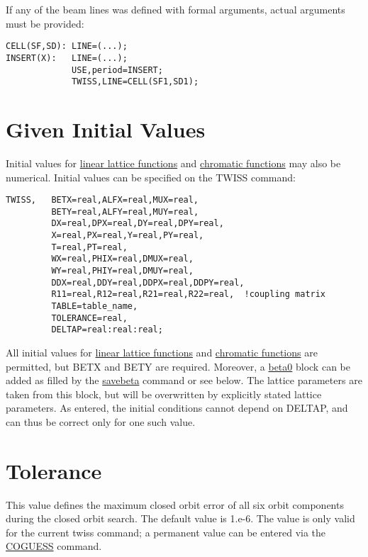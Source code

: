 If any of the beam lines was defined with formal arguments, actual
arguments must be provided:  
\begin{verbatim}
CELL(SF,SD): LINE=(...);
INSERT(X):   LINE=(...);
             USE,period=INSERT;
             TWISS,LINE=CELL(SF1,SD1);
\end{verbatim}

\section{Given Initial Values}

Initial values for \href{../Introduction/tables.html#linear}{linear
  lattice functions} and
\href{../Introduction/tables.html#chrom}{chromatic functions} may also
be numerical. Initial values can be specified on the TWISS command:  
\begin{verbatim}
TWISS,   BETX=real,ALFX=real,MUX=real,
         BETY=real,ALFY=real,MUY=real,
         DX=real,DPX=real,DY=real,DPY=real,
         X=real,PX=real,Y=real,PY=real,
         T=real,PT=real,
         WX=real,PHIX=real,DMUX=real,
         WY=real,PHIY=real,DMUY=real,
         DDX=real,DDY=real,DDPX=real,DDPY=real,
         R11=real,R12=real,R21=real,R22=real,  !coupling matrix
         TABLE=table_name,
         TOLERANCE=real,
         DELTAP=real:real:real;
\end{verbatim}

All initial values for \href{../Introduction/tables.html#linear}{linear
  lattice functions} and
\href{../Introduction/tables.html#chrom}{chromatic functions} are
permitted, but BETX and BETY are required. Moreover, a
\href{beta0}{beta0} block can be added as filled by the
\href{../control/general.html#savebeta}{savebeta} command or see
below. The lattice parameters are taken from this block, but will be
overwritten by explicitly stated lattice parameters. As entered, the
initial conditions cannot depend on DELTAP, and can thus be correct only
for one such value.  

\section{Tolerance}

This value defines the maximum closed orbit error of all six orbit
components during the closed orbit search. The default value is
1.e-6. The value is only valid for the current twiss command; a
permanent value can be entered via the
\href{../control/general.html#coguess}{COGUESS} command.  

